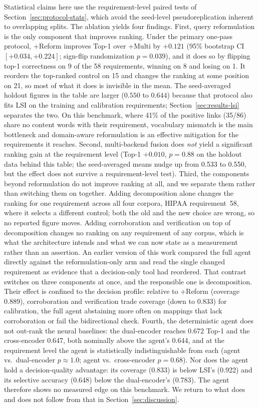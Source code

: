 \documentclass[a4paper,fleqn]{cas-sc}
\begin{document}
Statistical claims here use the requirement-level paired tests of Section~\ref{sec:protocol-stats}, which avoid the seed-level pseudoreplication inherent to overlapping splits.
The ablation yields four findings.
First, query reformulation is the only component that improves ranking. Under the primary one-pass protocol, +Reform improves Top-1 over +Multi by $+0.121$ (95\% bootstrap CI $[+0.034, +0.224]$; sign-flip randomization $p = 0.039$), and it does so by flipping top-1 correctness on 9 of the 58 requirements, winning on 8 and losing on 1. It reorders the top-ranked control on 15 and changes the ranking at some position on 21, so most of what it does is invisible in the mean. The seed-averaged holdout figures in the table are larger ($0.550$ to $0.644$) because that protocol also fits LSI on the training and calibration requirements; Section~\ref{sec:results-lsi} separates the two.
On this benchmark, where 41\% of the positive links (35/86) share no content words with their requirement, vocabulary mismatch is the main bottleneck and domain-aware reformulation is an effective mitigation for the requirements it reaches.
Second, multi-backend fusion does \emph{not} yield a significant ranking gain at the requirement level (Top-1 $+0.010$, $p = 0.88$ on the holdout data behind this table; the seed-averaged means nudge up from 0.533 to 0.550, but the effect does not survive a requirement-level test).
Third, the components beyond reformulation do not improve ranking at all, and we separate them rather than switching them on together. Adding decomposition alone changes the ranking for one requirement across all four corpora, HIPAA requirement~58, where it selects a different control; both the old and the new choice are wrong, so no reported figure moves. Adding corroboration and verification on top of decomposition changes no ranking on any requirement of any corpus, which is what the architecture intends and what we can now state as a measurement rather than an assertion. An earlier version of this work compared the full agent directly against the reformulation-only arm and read the single changed requirement as evidence that a decision-only tool had reordered. That contrast switches on three components at once, and the responsible one is decomposition. Their effect is confined to the decision profile: relative to +Reform (coverage 0.889), corroboration and verification trade coverage (down to 0.833) for calibration, the full agent abstaining more often on mappings that lack corroboration or fail the bidirectional check.
Fourth, the deterministic agent does not out-rank the neural baselines: the dual-encoder reaches 0.672 Top-1 and the cross-encoder 0.647, both nominally above the agent's 0.644, and at the requirement level the agent is statistically indistinguishable from each (agent vs.\ dual-encoder $p \approx 1.0$; agent vs.\ cross-encoder $p = 0.68$). Nor does the agent hold a decision-quality advantage: its coverage (0.833) is below LSI's (0.922) and its selective accuracy (0.648) below the dual-encoder's (0.783). The agent therefore shows no measured edge on this benchmark. We return to what does and does not follow from that in Section~\ref{sec:discussion}.
\end{document}
